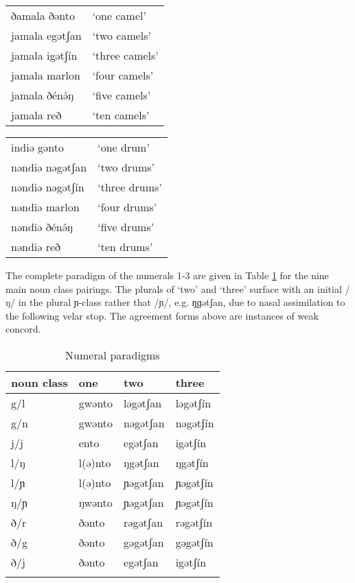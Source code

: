 \ea \ea \begin{tabular}[t]{ll}
ðamala ðənto	&	‘one camel’\\
jamala egətʃan	&	‘two camels’\\
jamala igətʃín	&	‘three camels’\\
jamala marlon	&	‘four camels’\\
jamala ðénə́ŋ	&	‘five camels’\\
jamala reð 		&	‘ten camels’ \\
\end{tabular}
	\ex \begin{tabular}[t]{ll}
indiə gənto		&	‘one drum’	\\
nəndiə nəgətʃan	&	‘two drums’\\
nəndiə nəgətʃín	&	‘three drums’\\
nəndiə marlon	&	‘four drums’\\
nəndiə ðénə́ŋ	&	‘five drums’\\
nəndiə reð 		& 	‘ten drums’  	\\
 \end{tabular}
	\z
\z

The complete paradigm of the numerals 1-3 are given in Table \ref{tab:ch8:3} for the nine main noun class pairings. The plurals of ‘two’ and ‘three’ surface with an initial /ŋ/ in the plural ɲ-class rather that /ɲ/, e.g. ŋ̘ɡətʃan, due to nasal assimilation to the following velar stop. The agreement forms above are instances of weak concord.


\begin{table}
 \begin{tabular}[t]{llll}
\lsptoprule
noun class & one & two & three\\
\midrule
g/l & gwənto & ləgətʃan & ləgətʃín\\
g/n	& gwənto & nəgətʃan & nəgətʃín\\
j/j & ento & egətʃan & igətʃín	\\
l/ŋ & l(ə)nto & ŋgətʃan & ŋgətʃín	\\
l/ɲ & l(ə)nto & ɲəgətʃan & ɲəgətʃín	\\
ŋ/ɲ & ŋwənto & ɲəgətʃan & ɲəgətʃín	\\
ð/r & ðənto & rəgətʃan & rəgətʃín	\\
ð/g & ðənto & gəgətʃan & gəgətʃín	\\
ð/j & ðənto & egətʃan & igətʃín	\\	
\lspbottomrule
 \end{tabular}
  \caption{Numeral paradigms}
  \label{tab:ch8:3}
\end{table}


